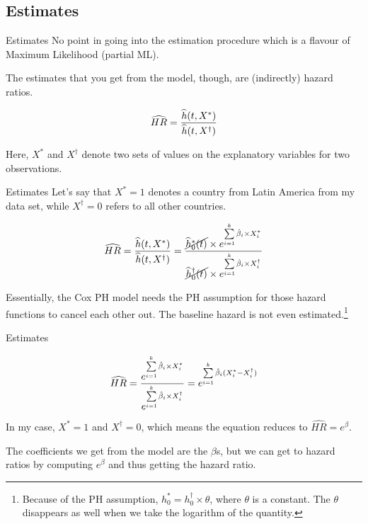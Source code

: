 \documentclass[12pt,english,pdf,xcolor=dvipsnames,aspectratio=169,handout]{beamer}\usepackage[]{graphicx}\usepackage[]{xcolor}
\begin{document}
\subsection{Estimates}
\begin{frame}{Estimates}
No point in going into the estimation procedure which is a flavour of Maximum Likelihood (partial ML).\bigskip

The estimates that you get from the model, though, are (indirectly) hazard ratios.\bigskip

\begin{equation}
\centering
\widehat{HR}=\frac{\widehat{h}(t,X^{*})}{\widehat{h}(t,X^{\dagger})}
\end{equation}

Here, $X^{*}$ and $X^{\dagger}$ denote two sets of values on the explanatory variables for two observations.
\end{frame}



\begin{frame}{Estimates}
Let's say that $X^{*}=1$ denotes a country from Latin America from my data set, while $X^{\dagger}=0$ refers to all other countries.\bigskip

\begin{equation}
  \centering
  \widehat{HR}=\frac{\widehat{h}(t,X^{*})}{\widehat{h}(t,X^{\dagger})}=\frac{\cancel{\widehat{h}_0^{*}(t)} \times e^{\sum\limits_{i=1}^k\hat{\beta}_i \times X_i^{*}}}{\cancel{\widehat{h}_0^{\dagger}(t)} \times e^{\sum\limits_{i=1}^k\hat{\beta}_i \times X_i^{\dagger}}}
\end{equation}

Essentially, the Cox PH model needs the PH assumption for those hazard functions to cancel each other out. The baseline hazard is not even estimated.\footnote{Because of the PH assumption, $h_0^{*}=h_0^{\dagger} \times \theta$, where $\theta$ is a constant. The $\theta$ disappears as well when we take the logarithm of the quantity.}
\end{frame}



\begin{frame}{Estimates}

\begin{equation}
  \centering
  \widehat{HR}=\frac{e^{\sum\limits_{i=1}^k\hat{\beta}_i \times X_i^{*}}}{e^{\sum\limits_{i=1}^k\hat{\beta}_i \times X_i^{\dagger}}}=e^{\sum\limits_{i=1}^{k}\hat{\beta}_i(X_i^{*} - X_i^{\dagger})}
\end{equation}

In my case, $X^{*}=1$ and  $X^{\dagger}=0$, which means the equation reduces to $\widehat{HR}=e^{\beta}$.\bigskip

The coefficients we get from the model are the $\beta$s, but we can get to hazard ratios by computing $e^{\beta}$ and thus getting the hazard ratio.
\end{frame}
\end{document}
